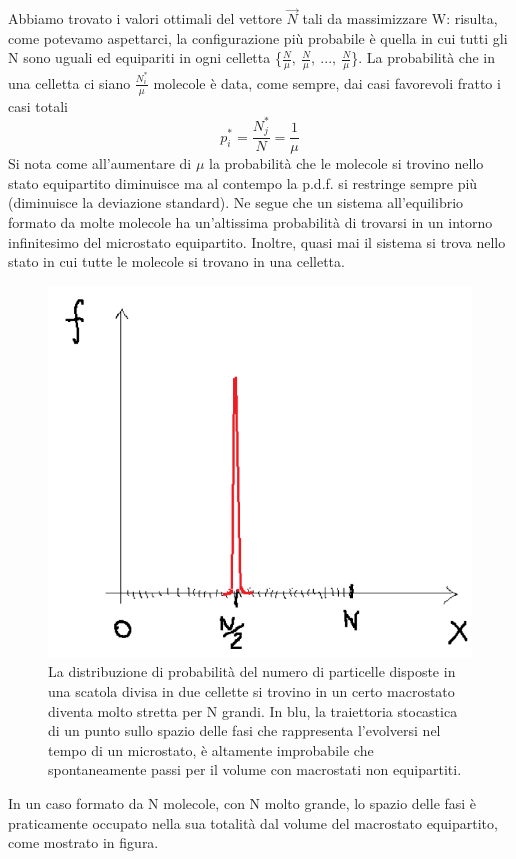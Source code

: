 \documentclass[
10pt, %
a4paper, %
oneside, %
headinclude,footinclude, %
BCOR5mm, %
]{scrartcl}
\begin{document}
Abbiamo trovato i valori ottimali del vettore $\vec{N}$ tali da massimizzare W: risulta, come potevamo aspettarci, la configurazione più probabile è quella in cui tutti gli N sono uguali ed equipariti in ogni celletta \{$\frac{N}{\mu},\ \frac{N}{\mu},\ ...,\ \frac{N}{\mu} $\}. La probabilità che in una celletta ci siano $\frac{N_i^*}{\mu}$ molecole è data, come sempre, dai casi favorevoli fratto i casi totali
\[p_i^*=\frac{N_j^*}{N}=\frac{1}{\mu}\]
Si nota come all'aumentare di $\mu$ la probabilità che le molecole si trovino nello stato equipartito diminuisce ma al contempo la p.d.f. si restringe sempre più (diminuisce la deviazione standard). Ne segue che un sistema all'equilibrio formato da molte molecole ha un'altissima probabilità di trovarsi in un intorno infinitesimo del microstato equipartito. Inoltre, quasi mai il sistema si trova nello stato in cui tutte le molecole si trovano in una celletta. 

\begin{figure}[h!]
	\centering
	\includegraphics[width=0.4\linewidth]{"../images/caso ad N"}
	\caption{La distribuzione di probabilità del numero di particelle disposte in una scatola divisa in due cellette si trovino in un certo macrostato diventa molto stretta per N grandi. In blu, la traiettoria stocastica di un punto sullo spazio delle fasi che rappresenta l'evolversi nel tempo di un microstato, è altamente improbabile che spontaneamente passi per il volume con macrostati non equipartiti. }
	\label{fig:caso-ad-n}
\end{figure}
\FloatBarrier
In un caso formato da N molecole, con N molto grande, lo spazio delle fasi è praticamente occupato nella sua totalità dal volume del macrostato equipartito, come mostrato in figura. 
\end{document}
